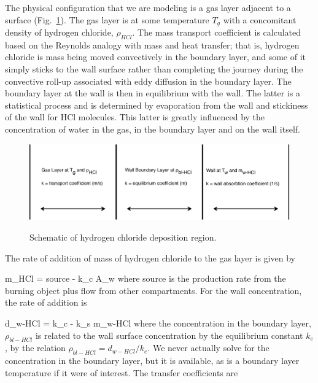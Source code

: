 The physical configuration that we are modeling is a gas layer adjacent to a surface (Fig.~\ref{fig:HCl_Deposition}).  The gas layer is at some temperature $T_g$ with a concomitant density of hydrogen chloride, $\rho_{HCl}$.  The mass transport coefficient is calculated based on the Reynolds analogy with mass and heat transfer; that is, hydrogen chloride is mass being moved convectively in the boundary layer, and some of it simply sticks to the wall surface rather than completing the journey during the convective roll-up associated with eddy diffusion in the boundary layer.  The boundary layer at the wall is then in equilibrium with the wall.  The latter is a statistical process and is determined by evaporation from the wall and stickiness of the wall for HCl molecules.  This latter is greatly influenced by the concentration of water in the gas, in the boundary layer and on the wall itself.

\begin{figure}[h]
\begin{center}
\includegraphics[width=5.0in]{FIGURES/Theory/HCl_Deposition}\\
\end{center}
\caption{Schematic of hydrogen chloride deposition region.}
 \label{fig:HCl_Deposition}
\end{figure}

The rate of addition of mass of hydrogen chloride to the gas layer is given by

\be {} m_{HCl} = source - k_c  A_w \ee
where source is the production rate from the burning object plus flow from other compartments. For the wall concentration, the rate of addition is

\be {} d_{w-HCl} = k_c  - k_s m_{w-HCl} \ee
where the concentration in the boundary layer, $\rho_{bl-HCl}$  is related to the wall surface concentration by the equilibrium constant $k_e$, by the relation $\rho_{bl-HCl} = d_{w-HCl} / k_e$. We never actually solve for the concentration in the boundary layer, but it is available, as is a boundary layer temperature if it were of interest.  The transfer coefficients are

